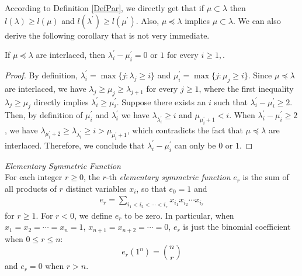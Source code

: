 According to Definition \ref{DefPar}, we directly get that if $\mu\subset \lambda$ then $l(\lambda)\geq l(\mu)$ and $l(\lambda^{\prime})\geq l(\mu^{\prime})$. Also, $\mu\preceq\lambda$ implies $\mu\subset\lambda$. We can also derive the following corollary that is not very immediate.
\begin{corollary}{\label{Cortranspar}}
	If $\mu\preceq\lambda$ are interlaced, then $\lambda^{\prime}_{i}-\mu^{\prime}_{i}=0\text{ or }1$ for every $i\geq 1,$.
\end{corollary}
\begin{proof}
	By definition, $\lambda^{\prime}_{i}=\max\{j:\lambda_{j}\geq i\}$ and $\mu^{\prime}_{i}=\max\{j:\mu_{j}\geq i\}$. Since $\mu\preceq\lambda$ are interlaced, we have $\lambda_{j}\geq \mu_{j}\geq \lambda_{j+1}$ for every $j\geq 1$, where the first inequality $\lambda_{j}\geq \mu_{j}$ directly implies $\lambda^{\prime}_{i}\geq \mu^{\prime}_{i}$. Suppose there exists an $i$ such that $\lambda^{\prime}_{i}-\mu^{\prime}_{i}\geq 2$. Then, by definition of $\mu^{\prime}_{i}$ and $\lambda^{\prime}_{i}$ we have $\lambda_{\lambda_{i}^{\prime}}\geq i$ and $\mu_{\mu_{i}^{\prime}+1}<i$. When $\lambda^{\prime}_{i}-\mu^{\prime}_{i}\geq 2$, we have $\lambda_{\mu^{\prime}_{i}+2}\geq \lambda_{\lambda_{i}^{\prime}}\geq i>\mu_{\mu_{i}^{\prime}+1}$, which contradicts the fact that $\mu\preceq\lambda$ are interlaced. Therefore, we conclude that $\lambda^{\prime}_{i}-\mu^{\prime}_{i}$ can only be $0$ or $1$.
\end{proof}
\begin{definition} \emph{Elementary Symmetric Function}{\label{ElemSymFunc}}\\
	For each integer $r\geq 0$, the $r$-th \emph{elementary symmetric function} $e_{r}$ is the sum of all products of $r$ distinct variables $x_i$, so that $e_0=1$ and
	\begin{align}
		e_{r}=\sum_{i_1<i_2<\cdots<i_r}x_{i_1}x_{i_2}\cdots x_{i_r}
	\end{align}
	for $r\geq 1$. For $r<0$, we define $e_r$ to be zero. In particular, when $x_1=x_2=\cdots=x_n=1$, $x_{n+1}=x_{n+2}=\cdots=0$, $e_r$ is just the binomial coefficient when $0\leq r\leq n$:
	 \begin{equation*}
	 	e_{r}(1^{n})=\binom{n}{r}
	 \end{equation*}
	 	and $e_r=0$ when $r>n$.
\end{definition}

